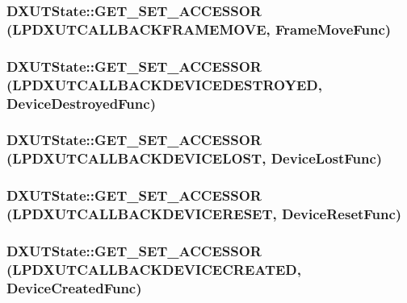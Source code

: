 \label{class_d_x_u_t_state_afe19dfed1649c90abbef63930ea59013}
\hypertarget{class_d_x_u_t_state_aca288de0e62695d031688b1808b1895a}{
\subsubsection[{GET\_\-SET\_\-ACCESSOR}]{\setlength{\rightskip}{0pt plus 5cm}DXUTState::GET\_\-SET\_\-ACCESSOR ({\bf LPDXUTCALLBACKFRAMEMOVE}, \/  FrameMoveFunc)}}
\label{class_d_x_u_t_state_aca288de0e62695d031688b1808b1895a}
\hypertarget{class_d_x_u_t_state_ad201110513d5835fd72a77c9f150b2d9}{
\subsubsection[{GET\_\-SET\_\-ACCESSOR}]{\setlength{\rightskip}{0pt plus 5cm}DXUTState::GET\_\-SET\_\-ACCESSOR ({\bf LPDXUTCALLBACKDEVICEDESTROYED}, \/  DeviceDestroyedFunc)}}
\label{class_d_x_u_t_state_ad201110513d5835fd72a77c9f150b2d9}
\hypertarget{class_d_x_u_t_state_a16537d6c5610b75f7dab7ab240503993}{
\subsubsection[{GET\_\-SET\_\-ACCESSOR}]{\setlength{\rightskip}{0pt plus 5cm}DXUTState::GET\_\-SET\_\-ACCESSOR ({\bf LPDXUTCALLBACKDEVICELOST}, \/  DeviceLostFunc)}}
\label{class_d_x_u_t_state_a16537d6c5610b75f7dab7ab240503993}
\hypertarget{class_d_x_u_t_state_a52f6283ad40d4aa454fff5e46bd78c4f}{
\subsubsection[{GET\_\-SET\_\-ACCESSOR}]{\setlength{\rightskip}{0pt plus 5cm}DXUTState::GET\_\-SET\_\-ACCESSOR ({\bf LPDXUTCALLBACKDEVICERESET}, \/  DeviceResetFunc)}}
\label{class_d_x_u_t_state_a52f6283ad40d4aa454fff5e46bd78c4f}
\hypertarget{class_d_x_u_t_state_a28ff6aa907bdf2d644e716809d675e3d}{
\subsubsection[{GET\_\-SET\_\-ACCESSOR}]{\setlength{\rightskip}{0pt plus 5cm}DXUTState::GET\_\-SET\_\-ACCESSOR ({\bf LPDXUTCALLBACKDEVICECREATED}, \/  DeviceCreatedFunc)}}
